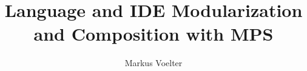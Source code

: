 \newcommand{\mvsubsec}[1]{\vspace{-2mm}\subsection{{#1}}\vspace{-1mm}}



\usepackage{verbatim}


\newenvironment{code} 
    {\vspace{3mm}
     \noindent
     \rule{\textwidth}{0.7pt}
     \vspace{-4mm}
     \scriptsize \verbatim}
    {\endverbatim \normalsize
	 \vspace{-4mm}
	 \rule{\textwidth}{0.7pt}
	 \vspace{0mm}
	 }



\usepackage{listings}

\newcommand{\phead}[1]{\vspace{8pt}\noindent$\blacksquare$\hspace{3pt}\textit{{#1}.}\hspace{8pt}}

%
%
%
%
%


\title{Language and IDE Modularization and Composition with MPS}


\author{Markus Voelter}



\maketitle


















